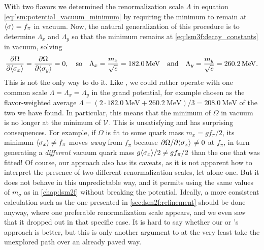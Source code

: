 With two flavors we determined the renormalization scale $\Lambda$ in equation \eqref{eq:lsm:potential_vacuum_minimum} by requiring the minimum to remain at $\langle \sigma \rangle=f_\pi$ in vacuum.
Now, the natural generalization of this procedure is to determine $\Lambda_x$ and $\Lambda_y$ so that the minimum remains at \eqref{eq:lsm3f:decay_constants} in vacuum, solving
\begin{equation}
	\pdv{\Omega}{ \langle \sigma_x \rangle} = \pdv{\Omega}{ \langle \sigma_y \rangle} = 0,
	\quad \text{so}
	\quad \Lambda_x = \frac{m_x}{\sqrt{e}} = \SI{182.0}{\mega\electronvolt}
	\quad \text{and} \quad
	\Lambda_y = \frac{m_y}{\sqrt{e}} = \SI{260.2}{\mega\electronvolt}.
\end{equation}
This is not the only way to do it.
Like \cite{ref:master_berge},
we could rather operate with one common scale $\Lambda = \Lambda_x = \Lambda_y$ in the grand potential,
for example chosen as the flavor-weighted average $\Lambda = (2 \cdot \SI{182.0}{\mega\electronvolt} + \SI{260.2}{\mega\electronvolt}) / 3 = \SI{208.0}{\mega\electronvolt}$ of the two we have found.
In particular, this means that the minimum of $\Omega$ in vacuum is no longer at the minimum of $\mathcal{V}$.
This is unsatisfying and has surprising consequences.
For example, if $\Omega$ is fit to some quark mass $m_x = g f_\pi /2$,
its minimum $\langle \sigma_x \rangle \neq f_\pi$ moves \emph{away} from $f_\pi$ because $\pdv{\Omega}/{\langle \sigma_x \rangle} \neq 0$ at $f_\pi$,
in turn generating a \emph{different} vacuum quark mass $g \langle \sigma_x \rangle / 2 \neq g f_\pi / 2$ than the one that was fitted!
Of course, our approach also has its caveats, as it is not apparent how to interpret the presence of two different renormalization scales, let alone one.
But it does not behave in this unpredictable way, and it permits using the same values of $m_\sigma$ as in \cref{chap:lsm2f} without breaking the potential.
Ideally, a more consistent calculation such as the one presented in \cref{sec:lsm2f:refinement} should be done anyway,
where one preferable renormalization scale appears, and we even saw that it dropped out in that specific case.
It is hard to say whether our or \cite{ref:master_berge}'s approach is better,
but this is only another argument to at the very least take the unexplored path over an already paved way.

